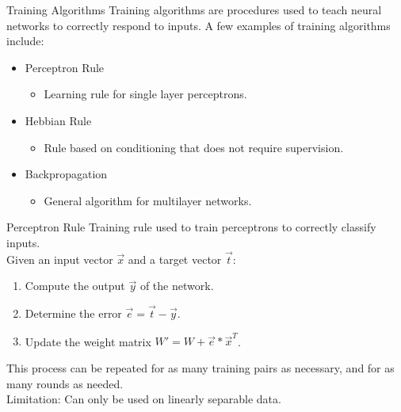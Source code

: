 \documentclass[11pt]{beamer}
\begin{document}
\begin{frame}{Training Algorithms}
Training algorithms are procedures used to teach neural networks to correctly respond to inputs. A few examples of training algorithms include:
\begin{itemize}
    \item Perceptron Rule
    \begin{itemize} \item Learning rule for single layer perceptrons. \end{itemize}
    \item Hebbian Rule
    \begin{itemize} \item Rule based on conditioning that does not require supervision. \end{itemize}
    \item Backpropagation
    \begin{itemize} \item General algorithm for multilayer networks. \end{itemize}
\end{itemize}
\end{frame}

\begin{frame}{Perceptron Rule}
Training rule used to train perceptrons to correctly classify inputs. \\
Given an input vector $\vec{x}$ and a target vector $\vec{t}$:
\begin{enumerate}
    \item Compute the output $\vec{y}$ of the network.
    \item Determine the error $\vec{e} = \vec{t} - \vec{y}$.
    \item Update the weight matrix $W' = W + \vec{e} * \vec{x}^T$.
\end{enumerate}
This process can be repeated for as many training pairs as necessary, and for as many rounds as needed. \\
Limitation: Can only be used on linearly separable data.
\end{frame}
\end{document}
